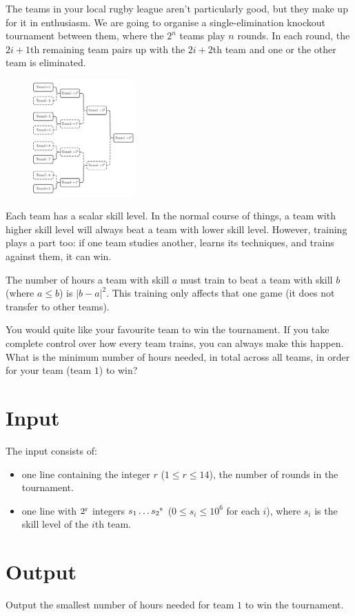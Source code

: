 
The teams in your local rugby league aren't particularly good, but they make up
for it in enthusiasm. We are going to organise a single-elimination knockout
tournament between them, where the $2^n$ teams play $n$ rounds. In each round,
the $2i+1$th remaining team pairs up with the $2i+2$th team and one or the
other team is eliminated.

\begin{figure}[h!]
  \centering
  \includegraphics[width=0.35\textwidth]{sample2}
 \label{fig:loweffortleague}
\end{figure}

Each team has a scalar skill level. In the normal course of things, a team with
higher skill level will always beat a team with lower skill level. However,
training plays a part too: if one team studies another, learns its techniques,
and trains against them, it can win.

The number of hours a team with skill $a$ must train to beat a team with skill
$b$ (where $a \le b$) is $|b-a|^2$. This training only affects that one game
(it does not transfer to other teams).

You would quite like your favourite team to win the tournament. If you take
complete control over how every team trains, you can always make this happen.
What is the minimum number of hours needed, in total across all teams, in order
for your team (team $1$) to win?

\section*{Input}

The input consists of:
\begin{itemize}
  \item one line containing the integer $r$ ($1 \le r \le 14 $), the number of
        rounds in the tournament.
  \item one line with $2\textsuperscript{r}$ integers $s_1 \ldots
        s_2\textsuperscript{s}$ ($0 \leq s_i \leq 10^6$ for each $i$), where $s_i$
        is the skill level of the $i$th team.
\end{itemize}

\section*{Output}

Output the smallest number of hours needed for team $1$ to win the tournament.
